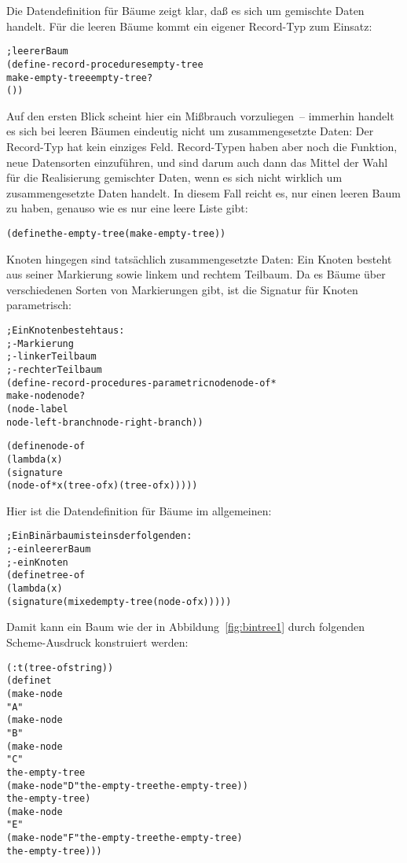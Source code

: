 Die Datendefinition für Bäume zeigt klar, daß es sich um gemischte
Daten handelt.  Für die leeren Bäume kommt ein eigener Record-Typ zum
Einsatz:
%
\begin{alltt}
;  leerer Baum
(define-record-procedures empty-tree
  make-empty-tree empty-tree?
  ())
\end{alltt}
%
Auf den ersten Blick scheint hier ein Mißbrauch vorzuliegen~--
immerhin handelt es sich bei leeren Bäumen eindeutig nicht um
zusammengesetzte Daten: Der Record-Typ
hat kein einziges Feld.  Record-Typen haben aber noch die 
Funktion, neue Datensorten einzuführen, und sind darum auch dann das
Mittel der Wahl für die Realisierung gemischter Daten,
wenn es sich nicht wirklich um zusammengesetzte Daten
handelt.  In diesem Fall reicht es, nur einen leeren
Baum zu haben, genauso wie es nur eine leere Liste gibt:
%
\begin{alltt}
(define the-empty-tree (make-empty-tree))
\end{alltt}
%
Knoten hingegen sind tatsächlich zusammengesetzte Daten: Ein Knoten
besteht aus seiner Markierung sowie linkem und rechtem
Teilbaum.  Da es Bäume über verschiedenen Sorten von Markierungen
gibt, ist die Signatur für Knoten parametrisch:
%
\begin{alltt}
; Ein Knoten besteht aus:
; - Markierung
; - linker Teilbaum
; - rechter Teilbaum
(define-record-procedures-parametric node node-of*
 make-node node?
 (node-label
  node-left-branch node-right-branch))

(define node-of
 (lambda (x)
   (signature
    (node-of* x (tree-of x) (tree-of x)))))
\end{alltt}
%
Hier ist die Datendefinition für Bäume im allgemeinen:
%
\begin{alltt}
; Ein Binärbaum ist eins der folgenden:
; - ein leerer Baum
; - ein Knoten
(define tree-of
 (lambda (x)
   (signature (mixed empty-tree (node-of x)))))
\end{alltt}
%
Damit kann ein Baum wie der in Abbildung~\ref{fig:bintree1} durch
folgenden Scheme-Ausdruck konstruiert werden:
%
\begin{alltt}
(: t (tree-of string))
(define t
  (make-node
   "A"
   (make-node
    "B"
    (make-node
     "C"
     the-empty-tree
     (make-node "D" the-empty-tree the-empty-tree))
    the-empty-tree)
   (make-node
    "E"
    (make-node "F" the-empty-tree the-empty-tree)
    the-empty-tree)))
\end{alltt}
